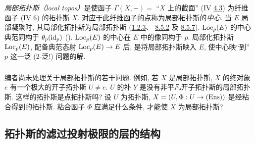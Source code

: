 \subsubsection{}

\emph{局部拓扑斯（local topos）}是使函子
$\Gamma(X,-)=$ “$X$ 上的截面”
(IV \hyperref[IV.subsec4.3]{4.3})
为纤维函子 (IV 6) 的拓扑斯 $X$.
对应于此纤维函子的点称为局部拓扑斯的\emph{中心}.
当 $E$ 局部凝聚时,
其局部化拓扑斯为局部拓扑斯
(\hyperref[VI.thm1.23]{1.2.3}、
\hyperref[VI.prop8.5.2]{8.5.2}
及 \hyperref[VI.cor8.5.7]{8.5.7}).
$\operatorname{Loc}_p(E)$ 的中心典范同构于 $\theta_p(\operatorname{id}_p)$
().
$\operatorname{Loc}_p(E)$ 的中心在 $E$ 中的像同构于 $p$.
局部化拓扑斯 $\operatorname{Loc}_p(E)$,
配备典范态射\pageoriginale{} $\Loc_p(E)\to E$ 后,
是将局部拓扑斯映入 $E$,
使中心映“到” $p$ 这一泛 (2-泛!) 问题的解.

\subsubsection{}

编者尚未处理关于局部拓扑斯的若干问题.
例如, 若 $X$ 是局部拓扑斯,
$X$ 的终对象 $e$ 有一个极大的开子拓扑斯 $U\ne e$.
$U$ 的补 $Y$ 是没有非平凡开子拓扑斯的局部拓扑斯.
这样的拓扑斯是点拓扑斯吗?
设 $U$ 为拓扑斯,
$X=(U,\Phi:U\to(\Ens))$ 是经粘合得到的拓扑斯.
粘合函子 $\Phi$ 应满足什么条件, 才能使 $X$ 为局部拓扑斯?




\subsection{拓扑斯的滤过投射极限的层的结构}

\subsubsection{}

